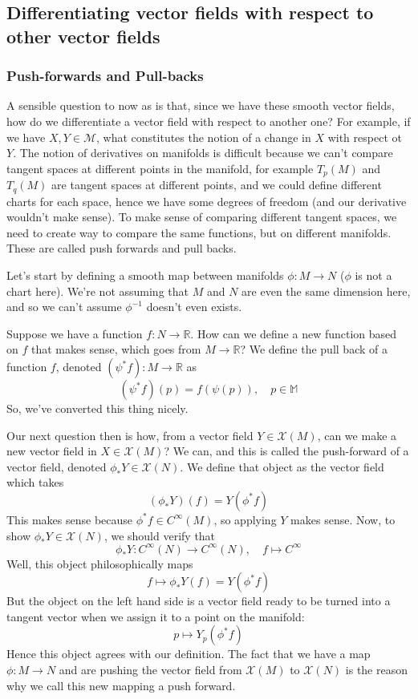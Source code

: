 \subsection{Differentiating vector fields with respect to other vector fields}

\subsubsection{Push-forwards and Pull-backs} 
A sensible question to now as is that, since we have these smooth vector fields, how do we differentiate a vector field with respect to another one? For example, if we have $X, Y \in \mathcal{M}$, what constitutes the notion of a change in $X$ with respect ot $Y$. The notion of derivatives on manifolds is difficult because we can't compare tangent spaces at different points in the manifold, for example $T_p(M )$ and $T_q(M) $ are tangent spaces at different points, and we could define different charts for each space, hence we have some degrees of freedom (and our derivative  wouldn't make sense).  To make sense of comparing different tangent spaces, we need to create way to compare the same functions, but on different manifolds. These are called push forwards and pull backs. 

Let's start by defining a smooth map between manifolds $\phi : M \rightarrow N$ ($\phi$ is not a chart here). We're not assuming that $M$ and $N$ are even the same dimension here, and so we can't assume $\phi^{ -1} $ doesn't even exists. 

Suppose we have a function $f: N \rightarrow \mathbb{R} $. How can we define a new function based on $f$ that makes sense, which goes from $M \rightarrow \mathbb{ R} $? We define the pull back of a function $f$, denoted $(\psi^* f) : M \rightarrow \mathbb{R} $ as 
\[
( \psi^* f ) ( p )  = f ( \psi ( p ) ), \quad p \in \mathbb{ M } 
\] So, we've converted this thing nicely. 

Our next question then is how, from a vector field $Y \in \mathcal{X} ( M )$, can we make a new vector field in $X \in \mathcal{X} ( M ) $? We can, and this is called the push-forward of a vector field, denoted $ \phi_* Y \in \mathcal{ X} ( N )$. We define that object as the vector field which takes 
\[ 
(\phi_*  Y ) ( f)  = Y ( \phi^* f ) 
\] 
This makes sense because $\phi^* f \in C^{\infty} ( M )$, so applying $Y$ makes sense. Now, to show $\phi_* Y \in \mathcal{X} ( N )$, we should verify that 
\[ 
\phi_* Y : C^\infty ( N ) \rightarrow C^\infty( N ), \quad f \mapsto C^{\infty} 
\] 
Well, this object philosophically maps 
\[ 
 f \mapsto \phi_* Y ( f)  = Y ( \phi^* f ) 
\]  But the object on the left hand side is a vector field ready to be turned into a tangent vector when we assign it to a point on the manifold: 
\[ 
p \mapsto Y_p ( \phi^* f ) 
\] Hence this object agrees with our definition. The fact that we have a map $\phi: M \rightarrow N$ and are pushing the vector field from $\mathcal{ X} ( M ) $ to $\mathcal{ X} ( N )$ is the reason why we call this new mapping a push forward. 

